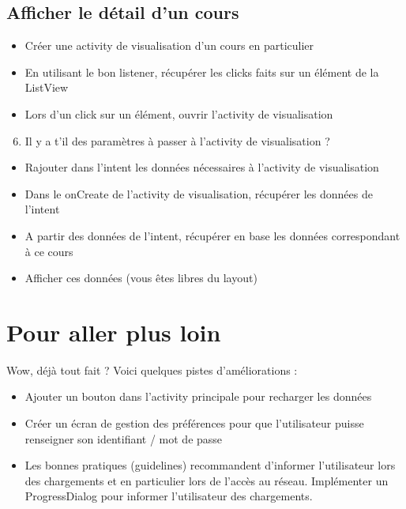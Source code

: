 \documentclass{article}
\begin{document}
\subsection{Afficher le détail d'un cours}
\begin{itemize} 
  \item Créer une activity de visualisation d'un cours en particulier
  \item En utilisant le bon listener, récupérer les clicks faits sur un élément
  de la ListView
  \item Lors d'un click sur un élément, ouvrir l'activity de visualisation
\end{itemize}
\begin{enumerate}
 \setcounter{enumi}{5}
 \item Il y a t'il des paramètres à passer à l'activity de visualisation ?
 \end{enumerate}
 \begin{itemize} 
  \item Rajouter dans l'intent les données nécessaires à l'activity de
  visualisation
  \item Dans le onCreate de l'activity de visualisation, récupérer les données
  de l'intent
  \item A partir des données de l'intent, récupérer en base les données
  correspondant à ce cours
  \item Afficher ces données (vous êtes libres du layout)
\end{itemize}
\section{Pour aller plus loin}
  Wow, déjà tout fait ? Voici quelques pistes d'améliorations :
\begin{itemize}
  \item Ajouter un bouton dans l'activity principale pour recharger les données
  \item Créer un écran de gestion des préférences pour que l'utilisateur puisse
  renseigner son identifiant / mot de passe
  \item Les bonnes pratiques (guidelines) recommandent d'informer l'utilisateur lors des chargements et en particulier lors de l'accès au réseau. Implémenter un ProgressDialog pour informer l'utilisateur des chargements.
 \end{itemize}
\end{document}
